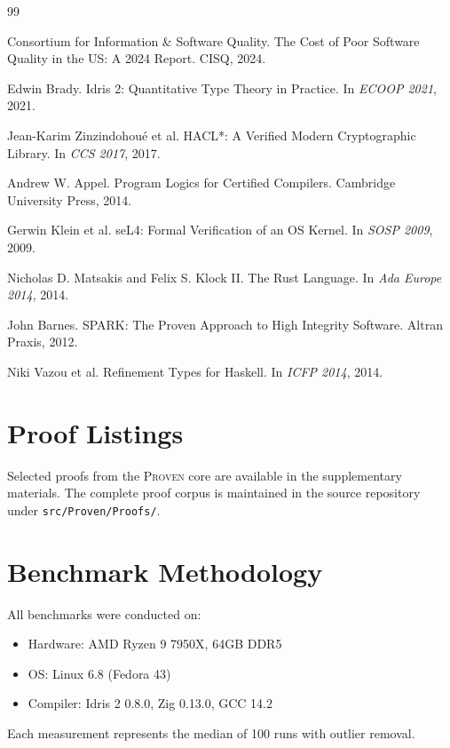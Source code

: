 \documentclass[11pt,a4paper]{article}
\newcommand{\proven}{\textsc{Proven}}
\begin{document}

\begin{thebibliography}{99}

Consortium for Information \& Software Quality.
\newblock The Cost of Poor Software Quality in the US: A 2024 Report.
\newblock CISQ, 2024.

Edwin Brady.
\newblock Idris 2: Quantitative Type Theory in Practice.
\newblock In \emph{ECOOP 2021}, 2021.

Jean-Karim Zinzindohoué et al.
\newblock HACL*: A Verified Modern Cryptographic Library.
\newblock In \emph{CCS 2017}, 2017.

Andrew W. Appel.
\newblock Program Logics for Certified Compilers.
\newblock Cambridge University Press, 2014.

Gerwin Klein et al.
\newblock seL4: Formal Verification of an OS Kernel.
\newblock In \emph{SOSP 2009}, 2009.

Nicholas D. Matsakis and Felix S. Klock II.
\newblock The Rust Language.
\newblock In \emph{Ada Europe 2014}, 2014.

John Barnes.
\newblock SPARK: The Proven Approach to High Integrity Software.
\newblock Altran Praxis, 2012.

Niki Vazou et al.
\newblock Refinement Types for Haskell.
\newblock In \emph{ICFP 2014}, 2014.

\end{thebibliography}

\appendix

\section{Proof Listings}

Selected proofs from the \proven{} core are available in the supplementary materials. The complete proof corpus is maintained in the source repository under \texttt{src/Proven/Proofs/}.

\section{Benchmark Methodology}

All benchmarks were conducted on:
\begin{itemize}
    \item Hardware: AMD Ryzen 9 7950X, 64GB DDR5
    \item OS: Linux 6.8 (Fedora 43)
    \item Compiler: Idris 2 0.8.0, Zig 0.13.0, GCC 14.2
\end{itemize}

Each measurement represents the median of 100 runs with outlier removal.
\end{document}

